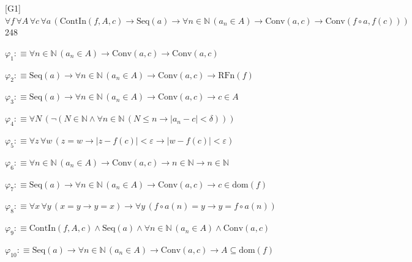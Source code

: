 \begin{fullproof}{[G1]}{$\forall f\,\forall A\,\forall c\,\forall a\,(\mathrm{ContIn}(f,A,c) \to \mathrm{Seq}(a) \to \forall n \in \mathbb{N}\,(a_{n} \in A) \to \mathrm{Conv}(a,c) \to \mathrm{Conv}(f \circ a,f(c)))$}{248}
\begin{ptree}
\noLine
{}
\noLine
{}
\noLine
{}
\end{ptree}
\begin{abbrevlist}
\item $\varphi_{1} :\equiv \forall n \in \mathbb{N}\,(a_{n} \in A) \to \mathrm{Conv}(a,c) \to \mathrm{Conv}(a,c)$
\item $\varphi_{2} :\equiv \mathrm{Seq}(a) \to \forall n \in \mathbb{N}\,(a_{n} \in A) \to \mathrm{Conv}(a,c) \to \mathrm{RFn}(f)$
\item $\varphi_{3} :\equiv \mathrm{Seq}(a) \to \forall n \in \mathbb{N}\,(a_{n} \in A) \to \mathrm{Conv}(a,c) \to c \in A$
\item $\varphi_{4} :\equiv \forall N\,(\neg (N \in \mathbb{N} \land \forall n \in \mathbb{N}\,(N \leq n \to \lvert a_{n} - c \rvert < \delta)))$
\item $\varphi_{5} :\equiv \forall z\,\forall w\,(z = w \to \lvert z - f(c) \rvert < \varepsilon \to \lvert w - f(c) \rvert < \varepsilon)$
\item $\varphi_{6} :\equiv \forall n \in \mathbb{N}\,(a_{n} \in A) \to \mathrm{Conv}(a,c) \to n \in \mathbb{N} \to n \in \mathbb{N}$
\item $\varphi_{7} :\equiv \mathrm{Seq}(a) \to \forall n \in \mathbb{N}\,(a_{n} \in A) \to \mathrm{Conv}(a,c) \to c \in \mathrm{dom}(f)$
\item $\varphi_{8} :\equiv \forall x\,\forall y\,(x = y \to y = x) \to \forall y\,(f \circ a(n) = y \to y = f \circ a(n))$
\item $\varphi_{9} :\equiv \mathrm{ContIn}(f,A,c) \land \mathrm{Seq}(a) \land \forall n \in \mathbb{N}\,(a_{n} \in A) \land \mathrm{Conv}(a,c)$
\item $\varphi_{10} :\equiv \mathrm{Seq}(a) \to \forall n \in \mathbb{N}\,(a_{n} \in A) \to \mathrm{Conv}(a,c) \to A \subseteq \mathrm{dom}(f)$

\end{abbrevlist}
\end{fullproof}
